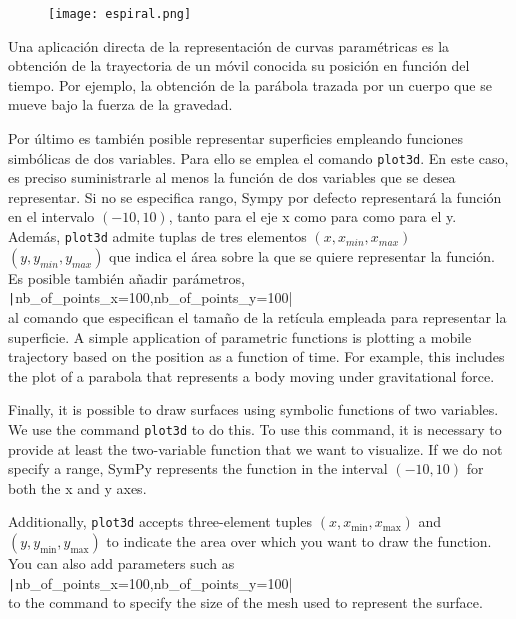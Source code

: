 \begin{figure}
	\centering
	\texttt{[image: espiral.png]}
		\label{fig:simpar}
		
\end{figure}
 

\begin{paracol}{2} 
Una aplicación directa de la representación de curvas paramétricas es la obtención de la trayectoria de un móvil conocida su posición en función del tiempo. Por ejemplo, la obtención de la parábola trazada por un cuerpo que se mueve bajo la fuerza de la gravedad. 


Por último es también posible representar superficies empleando funciones simbólicas de dos variables. Para ello se emplea el comando \texttt{plot3d}. En este caso, es preciso suministrarle al menos la función de dos variables que se desea representar. Si no se especifica rango, Sympy por defecto representará la función en el intervalo $(-10,10)$, tanto para el eje x como para  como para el y. Además, \texttt{plot3d} admite tuplas de tres elementos $(x, x_{min}, x_{max})$  $(y, y_{min},y_{max})$ que indica el área sobre la que se quiere representar la función. Es posible también añadir parámetros,\\ \texttt|nb_of_points_x=100,nb_of_points_y=100|\\  al comando que especifican el tamaño de la retícula empleada para representar la superficie. 
\switchcolumn
A simple application of parametric functions is plotting a mobile trajectory based on the position as a function of time. For example, this includes the plot of a parabola that represents a body moving under gravitational force.

Finally, it is possible to draw surfaces using symbolic functions of two variables. We use the command \texttt{plot3d} to do this. To use this command, it is necessary to provide at least the two-variable function that we want to visualize. If we do not specify a range, SymPy represents the function in the interval \((-10, 10)\) for both the x and y axes. 

Additionally, \texttt{plot3d} accepts three-element tuples \((x, x_{\text{min}}, x_{\text{max}})\) and \((y, y_{\text{min}}, y_{\text{max}})\) to indicate the area over which you want to draw the function. You can also add parameters such as\\ \texttt|nb_of_points_x=100,nb_of_points_y=100|\\ to the command to specify the size of the mesh used to represent the surface.
\end{paracol}  
